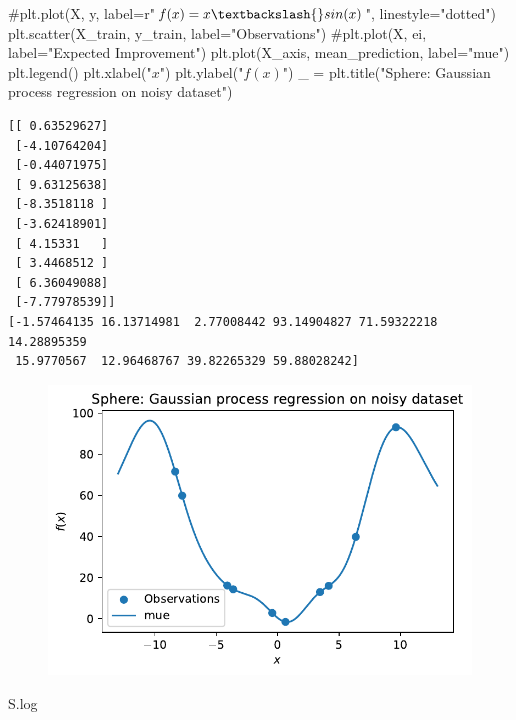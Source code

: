 \documentclass[
  letterpaper,
  DIV=11,
  numbers=noendperiod]{scrreprt}
\newenvironment{Shaded}{\begin{snugshade}}{\end{snugshade}}
\newcommand{\CommentTok}[1]{\textcolor[rgb]{0.37,0.37,0.37}{#1}}
\newcommand{\NormalTok}[1]{\textcolor[rgb]{0.00,0.23,0.31}{#1}}
\newcommand{\OperatorTok}[1]{\textcolor[rgb]{0.37,0.37,0.37}{#1}}
\newcommand{\StringTok}[1]{\textcolor[rgb]{0.13,0.47,0.30}{#1}}
\begin{document}
\begin{Shaded}
\begin{Highlighting}[]
\CommentTok{\#plt.plot(X, y, label=r"$f(x) = x \textbackslash{}sin(x)$", linestyle="dotted")}
\NormalTok{plt.scatter(X\_train, y\_train, label}\OperatorTok{=}\StringTok{"Observations"}\NormalTok{)}
\CommentTok{\#plt.plot(X, ei, label="Expected Improvement")}
\NormalTok{plt.plot(X\_axis, mean\_prediction, label}\OperatorTok{=}\StringTok{"mue"}\NormalTok{)}
\NormalTok{plt.legend()}
\NormalTok{plt.xlabel(}\StringTok{"$x$"}\NormalTok{)}
\NormalTok{plt.ylabel(}\StringTok{"$f(x)$"}\NormalTok{)}
\NormalTok{\_ }\OperatorTok{=}\NormalTok{ plt.title(}\StringTok{"Sphere: Gaussian process regression on noisy dataset"}\NormalTok{)}
\end{Highlighting}
\end{Shaded}

\begin{verbatim}
[[ 0.63529627]
 [-4.10764204]
 [-0.44071975]
 [ 9.63125638]
 [-8.3518118 ]
 [-3.62418901]
 [ 4.15331   ]
 [ 3.4468512 ]
 [ 6.36049088]
 [-7.77978539]]
[-1.57464135 16.13714981  2.77008442 93.14904827 71.59322218 14.28895359
 15.9770567  12.96468767 39.82265329 59.88028242]
\end{verbatim}

\begin{figure}[H]

{\centering \includegraphics{012_num_spot_ei_files/figure-pdf/cell-50-output-2.pdf}

}

\end{figure}

\begin{Shaded}
\begin{Highlighting}[]
\NormalTok{S.log}
\end{Highlighting}
\end{Shaded}
\end{document}

